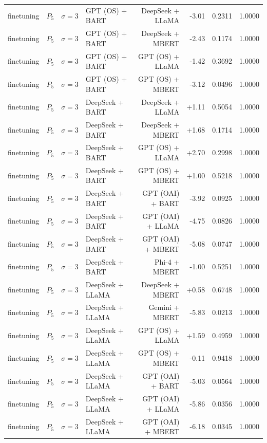 \begin{table}[htbp]
\begin{tabular*}{\textwidth}{@{\extracolsep{\fill}}llllrrrl}
finetuning & $P_5$ & $\sigma{=}3$ & GPT (OS) + BART & DeepSeek + LLaMA & -3.01 & 0.2311 & 1.0000 \\
finetuning & $P_5$ & $\sigma{=}3$ & GPT (OS) + BART & DeepSeek + MBERT & -2.43 & 0.1174 & 1.0000 \\
finetuning & $P_5$ & $\sigma{=}3$ & GPT (OS) + BART & GPT (OS) + LLaMA & -1.42 & 0.3692 & 1.0000 \\
finetuning & $P_5$ & $\sigma{=}3$ & GPT (OS) + BART & GPT (OS) + MBERT & -3.12 & 0.0496 & 1.0000 \\
finetuning & $P_5$ & $\sigma{=}3$ & DeepSeek + BART & DeepSeek + LLaMA & +1.11 & 0.5054 & 1.0000 \\
finetuning & $P_5$ & $\sigma{=}3$ & DeepSeek + BART & DeepSeek + MBERT & +1.68 & 0.1714 & 1.0000 \\
finetuning & $P_5$ & $\sigma{=}3$ & DeepSeek + BART & GPT (OS) + LLaMA & +2.70 & 0.2998 & 1.0000 \\
finetuning & $P_5$ & $\sigma{=}3$ & DeepSeek + BART & GPT (OS) + MBERT & +1.00 & 0.5218 & 1.0000 \\
finetuning & $P_5$ & $\sigma{=}3$ & DeepSeek + BART & GPT (OAI) + BART & -3.92 & 0.0925 & 1.0000 \\
finetuning & $P_5$ & $\sigma{=}3$ & DeepSeek + BART & GPT (OAI) + LLaMA & -4.75 & 0.0826 & 1.0000 \\
finetuning & $P_5$ & $\sigma{=}3$ & DeepSeek + BART & GPT (OAI) + MBERT & -5.08 & 0.0747 & 1.0000 \\
finetuning & $P_5$ & $\sigma{=}3$ & DeepSeek + BART & Phi-4 + MBERT & -1.00 & 0.5251 & 1.0000 \\
finetuning & $P_5$ & $\sigma{=}3$ & DeepSeek + LLaMA & DeepSeek + MBERT & +0.58 & 0.6748 & 1.0000 \\
finetuning & $P_5$ & $\sigma{=}3$ & DeepSeek + LLaMA & Gemini + MBERT & -5.83 & 0.0213 & 1.0000 \\
finetuning & $P_5$ & $\sigma{=}3$ & DeepSeek + LLaMA & GPT (OS) + LLaMA & +1.59 & 0.4959 & 1.0000 \\
finetuning & $P_5$ & $\sigma{=}3$ & DeepSeek + LLaMA & GPT (OS) + MBERT & -0.11 & 0.9418 & 1.0000 \\
finetuning & $P_5$ & $\sigma{=}3$ & DeepSeek + LLaMA & GPT (OAI) + BART & -5.03 & 0.0564 & 1.0000 \\
finetuning & $P_5$ & $\sigma{=}3$ & DeepSeek + LLaMA & GPT (OAI) + LLaMA & -5.86 & 0.0356 & 1.0000 \\
finetuning & $P_5$ & $\sigma{=}3$ & DeepSeek + LLaMA & GPT (OAI) + MBERT & -6.18 & 0.0345 & 1.0000 \\

\end{tabular*}
\end{table}
